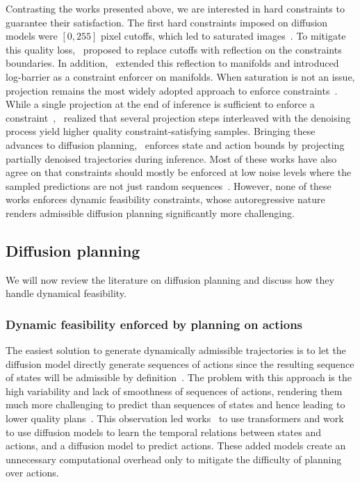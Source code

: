 Contrasting the works presented above, we are interested in hard constraints to guarantee their satisfaction. 
The first hard constraints imposed on diffusion models were $[0, 255]$ pixel cutoffs, which led to saturated images~\citep{Reflected}. To mitigate this quality loss,~\citep{Reflected} proposed to replace cutoffs with reflection on the constraints boundaries. In addition,~\citep{constraints} extended this reflection to manifolds and introduced log-barrier as a constraint enforcer on manifolds.
When saturation is not an issue, projection remains the most widely adopted approach to enforce constraints~\citep{Projected, CGD, romer2024safe, romer2024diffusion, PhysDiff}.
While a single projection at the end of inference is sufficient to enforce a constraint~\citep{CGD},~\citep{Projected, PhysDiff} realized that several projection steps interleaved with the denoising process yield higher quality constraint-satisfying samples.
Bringing these advances to diffusion planning,~\citep{romer2024safe} enforces state and action bounds by projecting partially denoised trajectories during inference. 
Most of these works have also agree on that constraints should mostly be enforced at low noise levels where the sampled predictions are not just random sequences~\citep{bastek2024physics, RyneBeeson, PhysDiff}. However, none of these works enforces dynamic feasibility constraints, whose autoregressive nature renders admissible diffusion planning significantly more challenging.


\subsection{Diffusion planning}\label{subsec: litt planning}

We will now review the literature on diffusion planning and discuss how they handle dynamical feasibility.

\subsubsection{Dynamic feasibility enforced by planning on actions}

The easiest solution to generate dynamically admissible trajectories is to let the diffusion model directly generate sequences of actions since the resulting sequence of states will be admissible by definition~\citep{Visuomotor, RyneBeeson, Diffusion_QLearning, zhong2023guided}. The problem with this approach is the high variability and lack of smoothness of sequences of actions, rendering them much more challenging to predict than sequences of states and hence leading to lower quality plans~\citep{DecisionDiffuser}. This observation led works~\citep{BESO, NoMaD} to use transformers and work~\citep{D-MPC} to use diffusion models to learn the temporal relations between states and actions, and a diffusion model to predict actions. These added models create an unnecessary computational overhead only to mitigate the difficulty of planning over actions.



